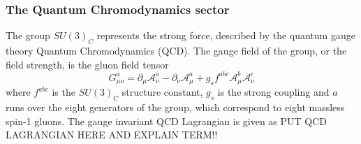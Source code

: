 \subsubsection{The Quantum Chromodynamics sector}
\label{sec:theory:qcd}
The group $SU(3)_C$ represents the strong force, described by the quantum gauge theory Quantum Chromodynamics (QCD). The gauge field of the group, or the field strength, is the gluon field tensor 
\begin{equation}
G_{\mu\nu}^a=\partial_{\mu} \mathcal{A}_{\nu}^a-\partial_{\nu} \mathcal{A}_{\mu}^a+g_s f^{abc}\mathcal{A}_{\mu}^b\mathcal{A}_{\nu}^c
\end{equation}
where $f^{abc}$ is the $SU(3)_C$ structure constant, $g_s$ is the strong coupling and $a$ runs over the eight generators of the group, which correspond to eight massless spin-1 gluons. The gauge invariant QCD Lagrangian is given as
PUT QCD LAGRANGIAN HERE AND EXPLAIN TERM!!

